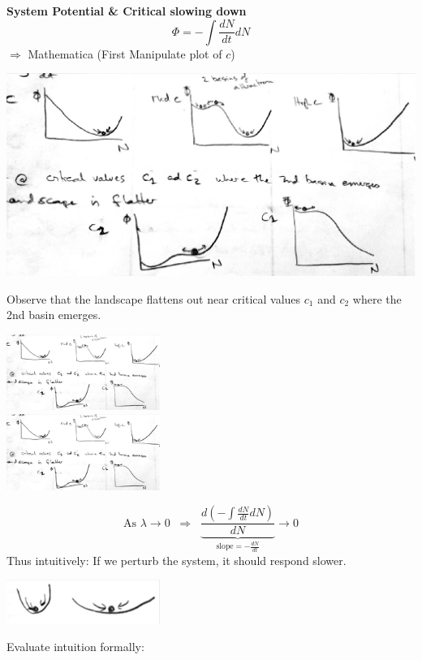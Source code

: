 \documentclass{article}
\newcommand{\note}[1]{\colorbox{gray!30}{#1}}
\newcommand{\ind}{\-\hspace{1cm}}
\begin{document}
\textbf{System Potential \& Critical slowing down}\\
\begin{equation*}
\Phi=-\int \frac{dN}{dt}dN
\end{equation*}
\ind \note{$\Rightarrow$ Mathematica (First Manipulate plot of $c$)}\\
\begin{center}
 	\includegraphics[width=15cm]{figs/Exploitation_SysPot.pdf}
\end{center}
Observe that the landscape flattens out near critical values $c_1$ and $c_2$ where the 2nd basin emerges.
\begin{center}
 	\includegraphics[width=5cm]{figs/Exploitation_SysPot_c2.pdf}\\
 	\includegraphics[width=5cm]{figs/Exploitation_SysPot_c1.pdf}
\end{center}
\begin{equation*}
\text{As }\lambda \to 0 \; \;  \Rightarrow \;\; \underbrace{\frac{d (- \int \frac{dN}{dt}dN)}{dN}}_{\text{slope} =-\frac{dN}{dt}} \to 0
\end{equation*}
Thus intuitively:  If we perturb the system, it should respond slower.
\begin{center}
 	\includegraphics[width=5cm]{figs/BallCup.pdf}
\end{center}
\pagebreak
Evaluate intuition formally:
\end{document}
